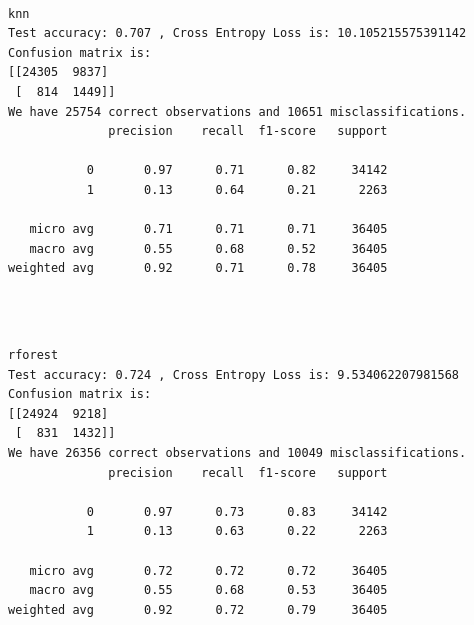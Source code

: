 \documentclass[8pt,onecolumn,aps,pra]{revtex4-1}
\begin{document}
    \begin{center}
    \end{center}
    { \hspace*{\fill} \\}
    
    \begin{Verbatim}[commandchars=\\\{\}]
knn
Test accuracy: 0.707 , Cross Entropy Loss is: 10.105215575391142
Confusion matrix is:
[[24305  9837]
 [  814  1449]]
We have 25754 correct observations and 10651 misclassifications.
              precision    recall  f1-score   support

           0       0.97      0.71      0.82     34142
           1       0.13      0.64      0.21      2263

   micro avg       0.71      0.71      0.71     36405
   macro avg       0.55      0.68      0.52     36405
weighted avg       0.92      0.71      0.78     36405


    \end{Verbatim}

    \begin{center}
    \end{center}
    { \hspace*{\fill} \\}
    
    \begin{Verbatim}[commandchars=\\\{\}]
rforest
Test accuracy: 0.724 , Cross Entropy Loss is: 9.534062207981568
Confusion matrix is:
[[24924  9218]
 [  831  1432]]
We have 26356 correct observations and 10049 misclassifications.
              precision    recall  f1-score   support

           0       0.97      0.73      0.83     34142
           1       0.13      0.63      0.22      2263

   micro avg       0.72      0.72      0.72     36405
   macro avg       0.55      0.68      0.53     36405
weighted avg       0.92      0.72      0.79     36405


    \end{Verbatim}

    \begin{center}
    \end{center}
    { \hspace*{\fill} \\}
    
\end{document}
